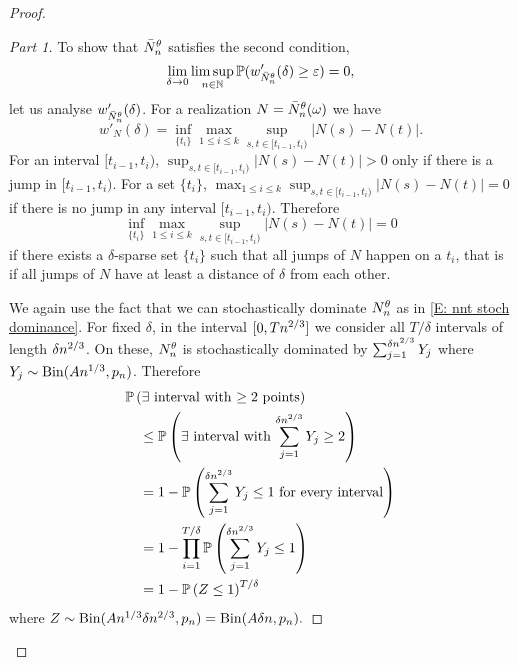 \begin{proof}
\begin{proof}[Part 1]
\bigskip

To show that $\bar{N}_n^{\theta}$ satisfies the second condition,
\begin{equation} \label{E: tightness cond 2}
\lim_{\delta \rightarrow 0} \limsup_{n \in \mathbb{N}}\mathbb{P}(w'_{\bar{N}_n^{\theta}}(\delta) \geq \varepsilon ) = 0,
\end{equation}
let us analyse $w'_{\bar{N}_n^{\theta}}(\delta)$.
For a realization $N = \bar{N}_n^{\theta}(\omega)$ we have
\begin{equation*}
w'_{N}(\delta) = \inf_{\{t_i\}} \max_{1\leq i \leq k} \sup_{s,t \in [t_{i-1}, t_i)} |N(s) - N(t)|.
\end{equation*}
For an interval $[t_{i-1}, t_i)$, 
$\sup_{s,t \in [t_{i-1}, t_i)} |N(s) - N(t)| > 0$ only if there is a jump in $[t_{i-1}, t_i)$.
For a set $\{t_i\}$, $\max_{1\leq i \leq k} \sup_{s,t \in [t_{i-1}, t_i)} |N(s) - N(t)| = 0$ if there is no jump in any interval $[t_{i-1}, t_i)$.
Therefore
\begin{equation*}
\inf_{\{t_i\}} \max_{1\leq i \leq k} \sup_{s,t \in [t_{i-1}, t_i)} |N(s) - N(t)| = 0
\end{equation*}
if there exists a $\delta$-sparse set $\{t_i\}$ such that all jumps of $N$ happen on a $t_i$,
that is if all jumps of $N$ have at least a distance of $\delta$ from each other.

We again use the fact that we can stochastically dominate $N_n^{\theta}$ as in \eqref{E: nnt stoch dominance}.
For fixed $\delta$, in the interval $[0, Tn^{2 / 3}]$ we consider all $T/\delta$ intervals of length $\delta n^{2 / 3}$.
On these, $N_n^{\theta}$ is stochastically dominated by $\sum_{j = 1}^{\delta n^{2 / 3}} Y_j$ where $Y_j \sim \operatorname*{Bin}(An^{1 / 3}, p_n)$.
Therefore
\begin{equation*}
\begin{aligned}
&\mathbb{P}\left( \text{$\exists$ interval with $\geq 2$ points} \right) \\
&\quad \leq \mathbb{P}\left( \text{$\exists$ interval with $\sum_{j = 1}^{\delta n^{2 / 3}} Y_j \geq 2$} \right) \\
&\quad = 1 - \mathbb{P}\left( \text{$\sum_{j = 1}^{\delta n^{2 / 3}} Y_j \leq 1$ for every interval} \right) \\
&\quad =  1 - \prod_{i=1}^{T/\delta}\mathbb{P}\left( \sum_{j = 1}^{\delta n^{2 / 3}} Y_j \leq 1 \right) \\
&\quad = 1 - \mathbb{P}\left( Z \leq 1 \right)^{T/\delta}
\end{aligned}
\end{equation*}
where $Z \sim \operatorname*{Bin}(An^{1 / 3}\delta n^{2 / 3}, p_n) = \operatorname*{Bin}(A\delta n, p_n).$


\end{proof}
\end{proof}
